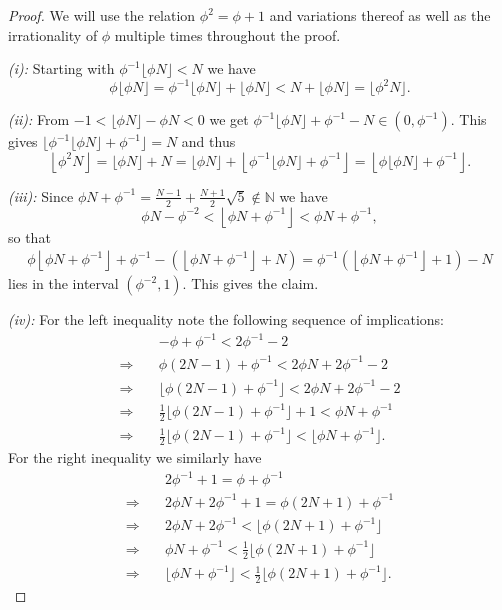 \documentclass[]{interact}
\newcommand{\bbN}{\mathbb{N}}
\theoremstyle{definition}
\numberwithin{table}{section} %
\numberwithin{figure}{section}
\begin{document}
\begin{proof}
    We will use the relation $\phi^2=\phi+1$ and variations thereof as well as the irrationality of $\phi$ multiple times throughout the proof.

    \textit{(i):} Starting with $\phi^{-1} \lfloor \phi N\rfloor < N$ we have
    $$
    \phi \lfloor \phi N\rfloor = \phi^{-1} \lfloor \phi N\rfloor + \lfloor \phi N\rfloor < N + \lfloor \phi N\rfloor = \lfloor \phi^2 N\rfloor.
    $$

    \textit{(ii):} From $-1 < \lfloor \phi N\rfloor - \phi N < 0$ we get $\phi^{-1}\lfloor \phi N \rfloor + \phi^{-1} - N \in (0, \phi^{-1})$. This gives $\lfloor \phi^{-1}\lfloor \phi N \rfloor + \phi^{-1} \rfloor = N$ and thus
    $$
    \left\lfloor \phi^2 N \right\rfloor = \lfloor \phi N \rfloor + N = \lfloor \phi N \rfloor + \left\lfloor \phi^{-1} \lfloor \phi N\rfloor + \phi^{-1} \right\rfloor = \left\lfloor \phi \lfloor \phi N \rfloor + \phi^{-1} \right\rfloor.
    $$

    \textit{(iii):} Since $\phi N + \phi^{-1} = \frac{N-1}{2} + \frac{N+1}{2}\sqrt5 \notin \bbN$ we have
	$$
	\phi N - \phi^{-2} < \left\lfloor \phi N + \phi^{-1}\right\rfloor < \phi N + \phi^{-1},
	$$
	so that
	\begin{align*}
		\phi \left\lfloor \phi N + \phi^{-1}\right\rfloor + \phi^{-1} - \left(\left\lfloor \phi N + \phi^{-1}\right\rfloor + N\right)
		= \phi^{-1} \left( \left\lfloor \phi N + \phi^{-1}\right\rfloor + 1\right) - N
	\end{align*}
	lies in the interval $(\phi^{-2}, 1)$. This gives the claim.

    \textit{(iv):} For the left inequality note the following sequence of implications:
    \begin{align*}
         & -\phi+\phi^{-1} < 2\phi^{-1} - 2 \\
         \Rightarrow \quad & \phi(2N-1)+\phi^{-1} < 2\phi N+2\phi^{-1}-2 \\
         \Rightarrow \quad & \lfloor \phi(2N-1)+\phi^{-1}\rfloor < 2\phi N +2\phi^{-1}-2 \\
         \Rightarrow \quad & \frac12\lfloor\phi(2N-1)+\phi^{-1}\rfloor+1<\phi N+\phi^{-1} \\
         \Rightarrow \quad & \frac12\lfloor\phi(2N-1)+\phi^{-1}\rfloor < \lfloor \phi N+\phi^{-1} \rfloor.
    \end{align*}
    For the right inequality we similarly have
    \begin{align*}
         & 2\phi^{-1} + 1 = \phi+\phi^{-1} \\
         \Rightarrow \quad & 2\phi N+2\phi^{-1} + 1 = \phi (2N+1)+\phi^{-1} \\
         \Rightarrow \quad & 2\phi N + 2\phi^{-1} < \lfloor \phi (2N+1)+\phi^{-1} \rfloor \\
         \Rightarrow \quad & \phi N + \phi^{-1} < \frac12 \lfloor \phi (2N+1)+\phi^{-1} \rfloor \\
         \Rightarrow \quad & \lfloor\phi N + \phi^{-1}\rfloor < \frac12 \lfloor \phi (2N+1)+\phi^{-1} \rfloor.
    \end{align*}
\end{proof}
\end{document}
